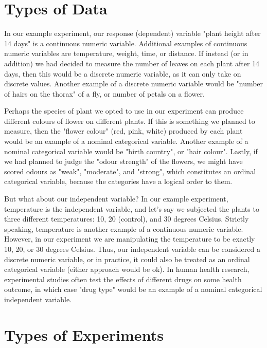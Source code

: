 \documentclass[
]{book}
\begin{document}
\hypertarget{types-of-data}{%
\section*{Types of Data}\label{types-of-data}}

In our example experiment, our response (dependent) variable "plant height after 14 days" is a continuous numeric variable. Additional examples of continuous numeric variables are temperature, weight, time, or distance. If instead (or in addition) we had decided to measure the number of leaves on each plant after 14 days, then this would be a discrete numeric variable, as it can only take on discrete values. Another example of a discrete numeric variable would be "number of hairs on the thorax" of a fly, or number of petals on a flower.

Perhaps the species of plant we opted to use in our experiment can produce different colours of flower on different plants. If this is something we planned to measure, then the "flower colour" (red, pink, white) produced by each plant would be an example of a nominal categorical variable. Another example of a nominal categorical variable would be "birth country", or "hair colour". Lastly, if we had planned to judge the "odour strength" of the flowers, we might have scored odours as "weak", "moderate", and "strong", which constitutes an ordinal categorical variable, because the categories have a logical order to them.

But what about our independent variable? In our example experiment, temperature is the independent variable, and let's say we subjected the plants to three different temperatures: 10, 20 (control), and 30 degrees Celsius. Strictly speaking, temperature is another example of a continuous numeric variable. However, in our experiment we are manipulating the temperature to be exactly 10, 20, or 30 degrees Celsius. Thus, our independent variable can be considered a discrete numeric variable, or in practice, it could also be treated as an ordinal categorical variable (either approach would be ok). In human health research, experimental studies often test the effects of different drugs on some health outcome, in which case "drug type" would be an example of a nominal categorical independent variable.

\hypertarget{types-of-experiments}{%
\section*{Types of Experiments}\label{types-of-experiments}}
\end{document}
